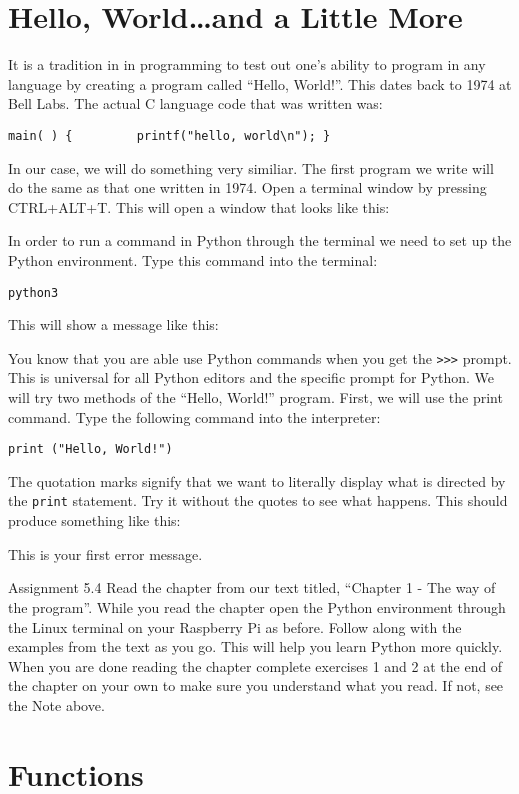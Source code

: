 \documentclass[
]{book}
\begin{document}
\hypertarget{hello-worldand-a-little-more}{%
\section{Hello, World\ldots and a Little More}\label{hello-worldand-a-little-more}}

It is a tradition in in programming to test out one's ability to program in any language by creating a program called ``Hello, World!''. This dates back to 1974 at Bell Labs. The actual C language code that was written was:

\texttt{main(\ )\ \{\ \ \ \ \ \ \ \ \ printf("hello,\ world\textbackslash{}n");\ \}}

In our case, we will do something very similiar. The first program we write will do the same as that one written in 1974. Open a terminal window by pressing CTRL+ALT+T. This will open a window that looks like this:

In order to run a command in Python through the terminal we need to set up the Python environment. Type this command into the terminal:

\texttt{python3}

This will show a message like this:

You know that you are able use Python commands when you get the \texttt{\textgreater{}\textgreater{}\textgreater{}} prompt. This is universal for all Python editors and the specific prompt for Python. We will try two methods of the ``Hello, World!'' program. First, we will use the print command. Type the following command into the interpreter:

\texttt{print\ ("Hello,\ World!")}

The quotation marks signify that we want to literally display what is directed by the \texttt{print} statement. Try it without the quotes to see what happens. This should produce something like this:

This is your first error message.

Assignment 5.4
Read the chapter from our text titled, ``Chapter 1 - The way of the program''. While you read the chapter open the Python environment through the Linux terminal on your Raspberry Pi as before. Follow along with the examples from the text as you go. This will help you learn Python more quickly. When you are done reading the chapter complete exercises 1 and 2 at the end of the chapter on your own to make sure you understand what you read. If not, see the Note above.

\hypertarget{functions}{%
\section{Functions}\label{functions}}
\end{document}
